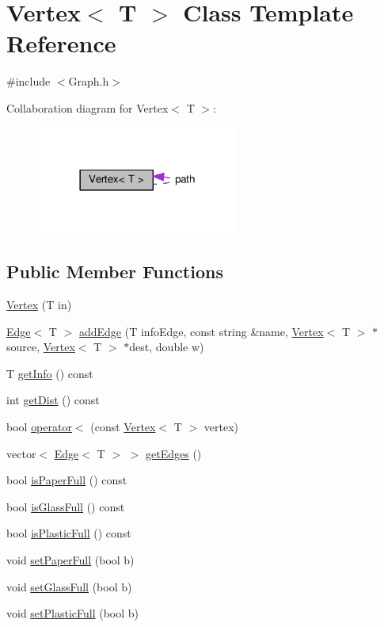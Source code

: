 \hypertarget{classVertex}{}\section{Vertex$<$ T $>$ Class Template Reference}
\label{classVertex}


{\ttfamily \#include $<$Graph.\+h$>$}



Collaboration diagram for Vertex$<$ T $>$\+:
\nopagebreak
\begin{figure}[H]
\begin{center}
\leavevmode
\includegraphics[width=189pt]{classVertex__coll__graph}
\end{center}
\end{figure}
\subsection*{Public Member Functions}
\begin{DoxyCompactItemize}
\item 
\hyperlink{classVertex_afcbdd4d4198b672356559cb8fa088408}{Vertex} (T in)
\item 
\hyperlink{classEdge}{Edge}$<$ T $>$ \hyperlink{classVertex_a78bc65f63d7244e6e161facdd49bd6e9}{add\+Edge} (T info\+Edge, const string \&name, \hyperlink{classVertex}{Vertex}$<$ T $>$ $\ast$source, \hyperlink{classVertex}{Vertex}$<$ T $>$ $\ast$dest, double w)
\item 
T \hyperlink{classVertex_a5880b4b252ae6818819c2f9645784b59}{get\+Info} () const 
\item 
int \hyperlink{classVertex_a3379c6cbcf1eaacc098381e3557a0b52}{get\+Dist} () const 
\item 
bool \hyperlink{classVertex_a7091b26f281a5041b1775a3d3f9cb7a6}{operator$<$} (const \hyperlink{classVertex}{Vertex}$<$ T $>$ vertex)
\item 
vector$<$ \hyperlink{classEdge}{Edge}$<$ T $>$ $>$ \hyperlink{classVertex_afc92f748469ed118f4a850cff31ae5b9}{get\+Edges} ()
\item 
bool \hyperlink{classVertex_ab96d7c8040c493d263993597b1cfad1f}{is\+Paper\+Full} () const 
\item 
bool \hyperlink{classVertex_aba8dc4e4450dbd6d697062ebd0ce17b1}{is\+Glass\+Full} () const 
\item 
bool \hyperlink{classVertex_a89b18f6ce97bc743e50a1552c44fa336}{is\+Plastic\+Full} () const 
\item 
void \hyperlink{classVertex_a285594d4012da238213d66cf969d0367}{set\+Paper\+Full} (bool b)
\item 
void \hyperlink{classVertex_a1da3731ebf22d296ef2aaf91990650db}{set\+Glass\+Full} (bool b)
\item 
void \hyperlink{classVertex_a065f344ac82d8943df5b607efa26941e}{set\+Plastic\+Full} (bool b)
\end{DoxyCompactItemize}
